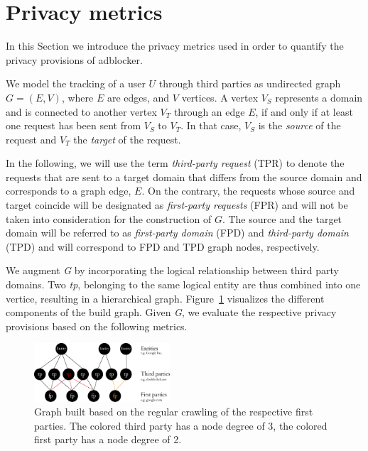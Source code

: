 \documentclass{sig-alternate}
\begin{document}
\section{Privacy metrics} \label{sec:privacy_metrics}
In this Section we introduce the privacy metrics used in order to quantify the privacy provisions of adblocker.


We model the tracking of a user $U$ through third parties as undirected graph $G=(E,V)$, where $E$ are edges, and $V$ vertices. A vertex $V_S$ represents a domain and is connected to another vertex $V_T$ through an edge $E$, if and only if at least one request has been sent from $V_S$ to $V_T$. In that case, $V_S$ is the \textit{source} of the request and $V_T$ the \textit{target} of the request.

In the following, we will use the term \textit{third-party request} (TPR) to denote the requests that are sent to a target domain that differs from the source domain and corresponds to a graph edge, $E$. On the contrary, the requests whose source and target coincide will be designated as \textit{first-party requests} (FPR) and will not be taken into consideration for the construction of $G$. The source and the target domain will be referred to as \textit{first-party domain} (FPD) and \textit{third-party domain} (TPD) and will correspond to FPD and TPD graph nodes, respectively.

We augment \emph{G} by incorporating the logical relationship between third party domains. Two \emph{tp}, belonging to the same logical entity are thus combined into one vertice, resulting in a hierarchical graph. Figure~\ref{fig:graph} visualizes the different components of the build graph. Given \emph{G}, we evaluate the respective privacy provisions based on the following metrics.

\begin{figure}[htb!]
  \centering
  \includegraphics[width=0.45\textwidth]{figures/graph.eps}
  \caption{Graph built based on the regular crawling of the respective first parties. The colored third party has a node degree of 3, the colored first party has a node degree of 2.}\label{fig:graph}
\end{figure}
\end{document}
